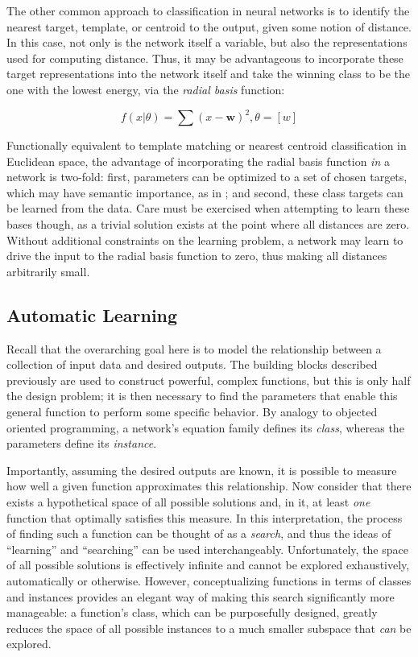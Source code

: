 The other common approach to classification in neural networks is to identify the nearest target, template, or centroid to the output, given some notion of distance.
In this case, not only is the network itself a variable, but also the representations used for computing distance.
Thus, it may be advantageous to incorporate these target representations into the network itself and take the winning class to be the one with the lowest energy, via the \emph{radial basis} function:

\begin{equation}
f(x | \theta) = \sum(x - \mathbf{w})^2, \theta = [w]
\end{equation}

\noindent Functionally equivalent to template matching or nearest centroid classification in Euclidean space, the advantage of incorporating the radial basis function \emph{in} a network is two-fold:
first, parameters can be optimized to a set of chosen targets, which may have semantic importance, as in \cite{LeCun1998Gradient};
and second, these class targets can be learned from the data.
Care must be exercised when attempting to learn these bases though, as a trivial solution exists at the point where all distances are zero.
Without additional constraints on the learning problem, a network may learn to drive the input to the radial basis function to zero, thus making all distances arbitrarily small.


\subsection{Automatic Learning}
\label{subsec:learning}

Recall that the overarching goal here is to model the relationship between a collection of input data and desired outputs.
The building blocks described previously are used to construct powerful, complex functions, but this is only half the design problem;
it is then necessary to find the parameters that enable this general function to perform some specific behavior.
By analogy to objected oriented programming, a network's equation family defines its \emph{class}, whereas the parameters define its \emph{instance}.

Importantly, assuming the desired outputs are known, it is possible to measure how well a given function approximates this relationship.
Now consider that there exists a hypothetical space of all possible solutions and, in it, at least \emph{one} function that optimally satisfies this measure.
In this interpretation, the process of finding such a function can be thought of as a \emph{search}, and thus the ideas of ``learning'' and ``searching'' can be used interchangeably.
Unfortunately, the space of all possible solutions is effectively infinite and cannot be explored exhaustively, automatically or otherwise.
However, conceptualizing functions in terms of classes and instances provides an elegant way of making this search significantly more manageable:
a function's class, which can be purposefully designed, greatly reduces the space of all possible instances to a much smaller subspace that \emph{can} be explored.

